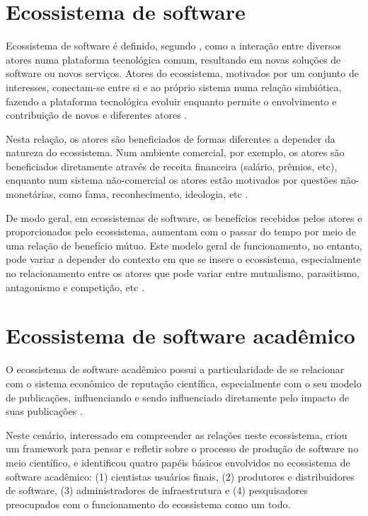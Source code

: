 \section{Ecossistema de software}

Ecossistema de software é definido, segundo ,
como a interação entre diversos atores numa plataforma tecnológica comum,
resultando em novas soluções de software ou novos serviços. Atores do
ecossistema, motivados por um conjunto de interesses, conectam-se entre si e ao
próprio sistema numa relação simbiótica, fazendo a plataforma tecnológica
evoluir enquanto permite o envolvimento e contribuição de novos e diferentes
atores \cite{manikas2013software}.

Nesta relação, os atores são beneficiados de formas diferentes a depender da
natureza do ecossistema. Num ambiente comercial, por exemplo, os atores são
beneficiados diretamente através de receita financeira (salário, prêmios, etc),
enquanto num sistema não-comercial os atores estão motivados por questões
não-monetárias, como fama, reconhecimento, ideologia, etc
\cite{manikas2013software}.

De modo geral, em ecossistemas de software, os benefícios recebidos pelos
atores e proporcionados pelo ecossistema, aumentam com o passar do tempo por
meio de uma relação de benefício mútuo.  Este modelo geral de funcionamento, no
entanto, pode variar a depender do contexto em que se insere o ecossistema,
especialmente no relacionamento entre os atores que pode variar entre
mutualismo, parasitismo, antagonismo e competição, etc
\cite{manikas2013software}.

\section{Ecossistema de software acadêmico}

O ecossistema de software acadêmico possui a particularidade de se relacionar
com o sistema econômico de reputação científica, especialmente com o seu modelo
de publicações, influenciando e sendo influenciado diretamente pelo impacto de
suas publicações \cite{howison2015understanding}.

Neste cenário, interessado em compreender as relações neste ecossistema,
 criou um framework para pensar e refletir
sobre o processo de produção de software no meio científico, e identificou quatro
papéis básicos envolvidos no ecossistema de software acadêmico: 
(1) cientistas usuários finais, (2) produtores e distribuidores de software, (3)
administradores de infraestrutura e (4) pesquisadores preocupados com o
funcionamento do ecossistema como um todo.

